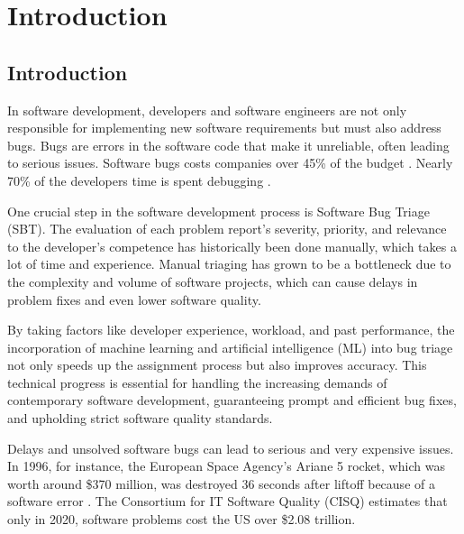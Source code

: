 
%

\chapter{Introduction}
\label{cha:introduction}


\section{Introduction}
\label{sec:if_you_use_this_template}

In software development, developers and software engineers are not only responsible for implementing new software requirements but must also address bugs. Bugs are errors in the software code that make it unreliable, often leading to serious issues. Software bugs costs companies over 45\% of the budget \cite{Xuan2015}. Nearly 70\% of the developers time is spent debugging \cite{Minelli2015}.

One crucial step in the software development process is Software Bug Triage (SBT). The evaluation of each problem report's severity, priority, and relevance to the developer's competence has historically been done manually, which takes a lot of time and experience. Manual triaging has grown to be a bottleneck due to the complexity and volume of software projects, which can cause delays in problem fixes and even lower software quality. 

By taking factors like developer experience, workload, and past performance, the incorporation of machine learning and artificial intelligence (ML) into bug triage not only speeds up the assignment process but also improves accuracy. This technical progress is essential for handling the increasing demands of contemporary software development, guaranteeing prompt and efficient bug fixes, and upholding strict software quality standards.

Delays and unsolved software bugs can lead to serious and very expensive issues. In 1996, for instance, the European Space Agency's Ariane 5 rocket, which was worth around \$370 million, was destroyed 36 seconds after liftoff because of a software error \cite{Ariane5}. The Consortium for IT Software Quality (CISQ) estimates that only in 2020, software problems cost the US over \$2.08 trillion. 




